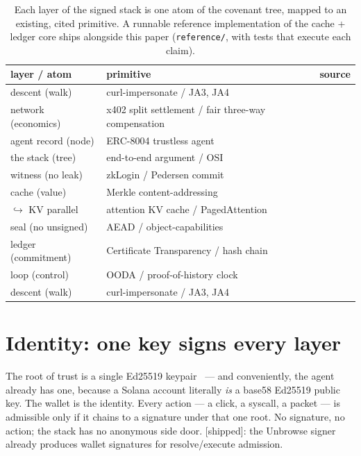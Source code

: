 \documentclass[11pt]{article}
\newcommand{\impl}{\textcolor{green!55!black}{\small[shipped]}}
\begin{document}
\begin{table}[h]
\centering
\small
\begin{tabular}{@{}lll@{}}
\hline
\textbf{layer / atom} & \textbf{primitive} & \textbf{source} \\
\hline
descent (walk)       & curl-impersonate / JA3, JA4   & \cite{curlimpersonate,ja3,ja4} \\
network (economics)  & x402 split settlement / fair three-way compensation & \cite{x402} \\
agent record (node)  & ERC-8004 trustless agent      & \cite{erc8004} \\
the stack (tree)     & end-to-end argument / OSI     & \cite{e2e,osi} \\
witness (no leak)    & zkLogin / Pedersen commit     & \cite{zklogin,pedersen} \\
cache (value)        & Merkle content-addressing     & \cite{merkle} \\
\quad $\hookrightarrow$ KV parallel & attention KV cache / PagedAttention & \cite{attention,pagedattention} \\
seal (no unsigned)   & AEAD / object-capabilities    & \cite{rfc5116,ocap} \\
ledger (commitment)  & Certificate Transparency / hash chain & \cite{rfc6962,bitcoin} \\
loop (control)       & OODA / proof-of-history clock & \cite{ooda,solana} \\
descent (walk)       & curl-impersonate / JA3, JA4   & \cite{curlimpersonate,ja3,ja4} \\
\hline
\end{tabular}
\caption{Each layer of the signed stack is one atom of the covenant tree, mapped
to an existing, cited primitive. A runnable reference implementation of the cache
+ ledger core ships alongside this paper (\texttt{reference/}, with tests that
execute each claim).}
\label{tab:atoms}
\end{table}

\section{Identity: one key signs every layer}
The root of trust is a single Ed25519 keypair~\cite{rfc8032} --- and conveniently,
the agent already has one, because a Solana account literally \emph{is} a base58
Ed25519 public key. The wallet is the identity. Every action --- a click, a
syscall, a packet --- is admissible only if it chains to a signature under that one
root. No signature, no action; the stack has no anonymous side door. \impl{}: the
Unbrowse signer already produces wallet signatures for resolve/execute admission.
\end{document}
